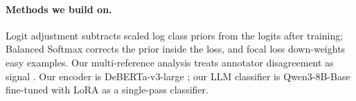\paragraph{Methods we build on.}
Logit adjustment \citep{menon2021longtail} subtracts scaled log class priors from the logits after training; Balanced Softmax \citep{ren2020balanced} corrects the prior inside the loss, and focal loss \citep{lin2017focal} down-weights easy examples.
Our multi-reference analysis treats annotator disagreement as signal \citep{uma2021learning}.
Our encoder is DeBERTa-v3-large \citep{he2023debertav3}; our LLM classifier is Qwen3-8B-Base \citep{qwen3} fine-tuned with LoRA \citep{hu2022lora} as a single-pass classifier.
